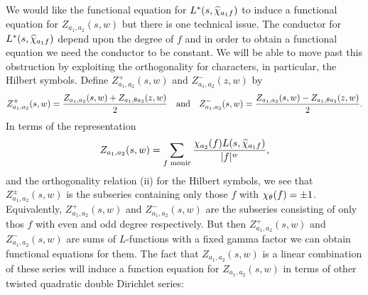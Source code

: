 \documentclass[12pt,reqno,oneside]{amsart}
\begin{document}
    We would like the functional equation for $L^{\ast}(s,\widehat{\chi}_{a_{1}f})$ to induce a functional equation for $Z_{a_{1},a_{2}}(s,w)$ but there is one technical issue. The conductor for $L^{\ast}(s,\widehat{\chi}_{a_{1}f})$ depend upon the degree of $f$ and in order to obtain a functional equation we need the conductor to be constant. We will be able to move past this obstruction by exploiting the orthogonality for characters, in particular, the Hilbert symbols. Define $Z_{a_{1},a_{2}}^{+}(s,w)$ and $Z_{a_{1},a_{2}}^{-}(z,w)$ by
    \[
        Z_{a_{1},a_{2}}^{+}(s,w) = \frac{Z_{a_{1},a_{2}}(s,w)+Z_{a_{1},\theta a_{2}}(z,w)}{2} \quad \text{and} \quad Z_{a_{1},a_{2}}^{-}(s,w) = \frac{Z_{a_{1},a_{2}}(s,w)-{Z_{a_{1},\theta a_{2}}(z,w)}}{2}.
    \]
    In terms of the representation
    \[
        Z_{a_{1},a_{2}}(s,w) = \sum_{\text{$f$ monic}}\frac{\chi_{a_{2}}(f)L(s,\widehat{\chi}_{a_{1}f})}{|f|^{w}},
    \]
    and the orthogonality relation (ii) for the Hilbert symbols, we see that $Z_{a_{1},a_{2}}^{\pm}(s,w)$ is the subseries containing only those $f$ with $\chi_{\theta}(f) = \pm 1$. Equivalently, $Z_{a_{1},a_{2}}^{+}(s,w)$ and $Z_{a_{1},a_{2}}^{-}(s,w)$ are the subseries consisting of only thos $f$ with even and odd degree respectively. But then $Z_{a_{1},a_{2}}^{+}(s,w)$ and $Z_{a_{1},a_{2}}^{-}(s,w)$ are sums of $L$-functions with a fixed gamma factor we can obtain functional equations for them. The fact that $Z_{a_{1},a_{2}}(s,w)$ is a linear combination of these series will induce a function equation for $Z_{a_{1},a_{2}}(s,w)$ in terms of other twisted quadratic double Dirichlet series:
\end{document}
